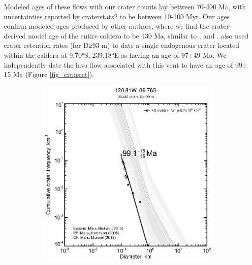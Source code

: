 \documentclass[12pt,letter]{article}
\begin{document}
Modeled ages of these flows with our crater counts lay between 70-400 Ma, with uncertainties reported by craterstats2 to be between 10-100 Myr. Our ages confirm modeled ages produced by other authors, where we find the crater-derived model age of the entire caldera to be 130 Ma, similar to  \citet{neukum2004recent}, \citet{werner2009global} and \citep{robbins2011volcanic}. \citet{robbins2011volcanic} also used crater retention rates (for D≥93 m) to date a single endogenous crater located within the caldera at 9.70°S, 239.18°E as having an age of 97$\pm$49 Ma. We independently date the lava flow associated with this vent to have an age of 99$\pm$15 Ma (Figure \ref{fig_craterct}).


\begin{figure}
\centering
\begin{subfigure}{.33\textwidth}
  \includegraphics[width=\linewidth,clip,trim=1cm 1cm 1.5cm 1cm]{figures/craterstats/120-81W_09-76S_100m_cum.eps}
\end{subfigure}%
\begin{subfigure}{.33\textwidth}

\end{subfigure}
\end{figure}
\end{document}
